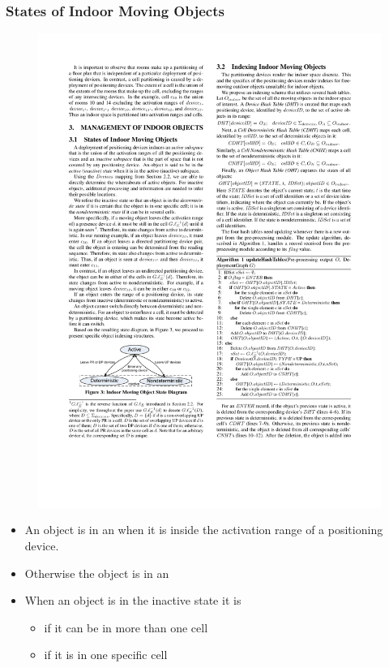 \begin{frame}
\frametitle{States of Indoor Moving Objects}


  \begin{figure}[tb]
    \includegraphics[width=0.6\columnwidth]{figures/2-2/2-2-3.pdf}
  \end{figure}
  \vspace{-10pt}
  \begin{itemize}
    \item An object is in an  when it is inside the activation range of a positioning device.
    \item Otherwise the object is in an 
    \item When an object is in the inactive state it is
      \begin{itemize}
        \item {} if it can be in more than one cell
        \item {} if it is in one specific cell
      \end{itemize}
  \end{itemize}


\end{frame}


